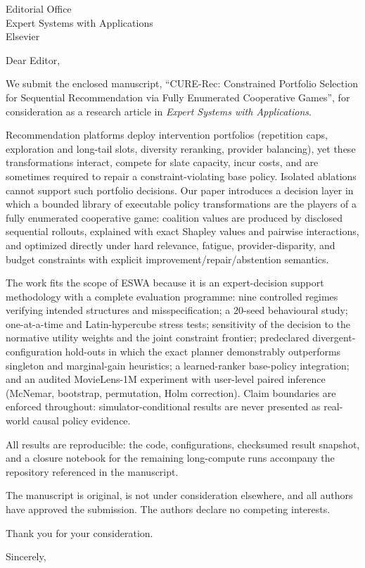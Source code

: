\documentclass[11pt]{letter}
\begin{document}
\begin{letter}{Editorial Office\\Expert Systems with Applications\\Elsevier}
\opening{Dear Editor,}

We submit the enclosed manuscript, ``CURE-Rec: Constrained Portfolio Selection for Sequential Recommendation via Fully Enumerated Cooperative Games'', for consideration as a research article in \textit{Expert Systems with Applications}.

Recommendation platforms deploy intervention portfolios (repetition caps, exploration and long-tail slots, diversity reranking, provider balancing), yet these transformations interact, compete for slate capacity, incur costs, and are sometimes required to repair a constraint-violating base policy. Isolated ablations cannot support such portfolio decisions. Our paper introduces a decision layer in which a bounded library of executable policy transformations are the players of a fully enumerated cooperative game: coalition values are produced by disclosed sequential rollouts, explained with exact Shapley values and pairwise interactions, and optimized directly under hard relevance, fatigue, provider-disparity, and budget constraints with explicit improvement/repair/abstention semantics.

The work fits the scope of ESWA because it is an expert-decision support methodology with a complete evaluation programme: nine controlled regimes verifying intended structures and misspecification; a 20-seed behavioural study; one-at-a-time and Latin-hypercube stress tests; sensitivity of the decision to the normative utility weights and the joint constraint frontier; predeclared divergent-configuration hold-outs in which the exact planner demonstrably outperforms singleton and marginal-gain heuristics; a learned-ranker base-policy integration; and an audited MovieLens-1M experiment with user-level paired inference (McNemar, bootstrap, permutation, Holm correction). Claim boundaries are enforced throughout: simulator-conditional results are never presented as real-world causal policy evidence.

All results are reproducible: the code, configurations, checksumed result snapshot, and a closure notebook for the remaining long-compute runs accompany the repository referenced in the manuscript.

The manuscript is original, is not under consideration elsewhere, and all authors have approved the submission. The authors declare no competing interests.

Thank you for your consideration.

\closing{Sincerely,}
\end{letter}
\end{document}

